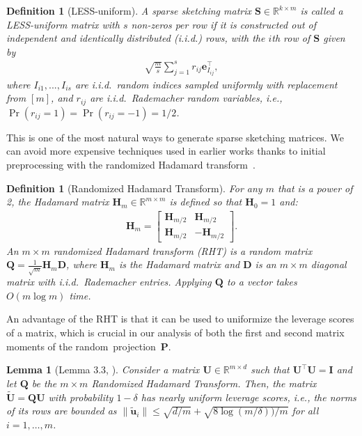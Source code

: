 \documentclass[11pt]{article}
\let\origtop\top
\renewcommand\top{{\scriptscriptstyle{\origtop}}}
\def\e{{\mathbf e}}
\def\u{{\mathbf u}}
\def\H{{\mathbf H}}
\def\I{{\mathbf I}}
\def\Q{{\mathbf Q}}
\def\S{{\mathbf S}}
\def\D{{\mathbf D}}
\def\P{{\mathbf P}}
\def\R{{\mathbf R}}
\def\U{{\mathbf U}}
\def\R{{\mathds R}}
\newtheorem{lem}[thm]{Lemma}
\newtheorem{dfn}[thm]{Definition}
\begin{document}
\begin{dfn}[LESS-uniform]\label{d:less}
A sparse sketching matrix $\S\in\R^{k\times m}$ is called a LESS-uniform matrix with $s$ non-zeros per row if it is constructed out of independent and identically distributed (i.i.d.) rows, with the $i$th row of $\S$ given by
  \begin{align*}
    \sqrt{\frac ms}\sum_{j=1}^s r_{ij}\e_{I_{ij}}^\top,
  \end{align*}
  where $I_{i1},...,I_{is}$ are i.i.d.\ random indices sampled uniformly with replacement from $[m]$, and $r_{ij}$ are i.i.d.\
  Rademacher random variables, i.e., $\Pr(r_{ij}=1)=\Pr(r_{ij}=-1)=1/2$.
\end{dfn}
\noindent
This is one of the most natural ways to generate sparse sketching matrices. We can avoid more expensive techniques used in earlier works \cite{derezinski2024sharp} thanks to initial preprocessing with the randomized Hadamard transform~\cite{ailon2009fast}.
\begin{dfn}[Randomized Hadamard Transform]\label{d:rht}
    For any $m$ that is a power of 2, the Hadamard matrix $\H_m\in\R^{m\times m}$ is defined so that $\H_0 = 1$ and:
    \begin{align*}
        \H_m=\begin{bmatrix}
            \H_{m/2}&\H_{m/2}\\
            \H_{m/2}&-\H_{m/2}
        \end{bmatrix}.
    \end{align*}
    An $m\times m$ randomized Hadamard transform 
    (RHT) is a random matrix $\Q=\frac1{\sqrt m}\H_m\D$, where $\H_m$ is the Hadamard matrix and $\D$ is an $m\times m$ diagonal matrix with i.i.d.~Rademacher entries. Applying $\Q$ to a vector takes $O(m\log m)$ time.
\end{dfn}
\noindent
An advantage of the RHT is that it can be used to uniformize the leverage scores of a matrix, which is crucial in our analysis of both the first and second matrix moments of the random~projection~$\P$.
\begin{lem}[Lemma 3.3, \cite{tropp2011improved}]\label{l:rht}
    Consider a matrix $\U\in\R^{m\times d}$ such that $\U^\top\U=\I$ and let $\Q$ be the $m\times m$ Randomized Hadamard Transform. Then, the matrix $\tilde\U=\Q\U$ with probability $1-\delta$ has nearly uniform leverage scores,
    i.e., the norms of its rows are bounded as $\|\tilde\u_i\| \leq \sqrt{d/m}+\sqrt{8\log(m/\delta))/m}$ for all $i = 1, \ldots, m$. 
\end{lem}
\end{document}
